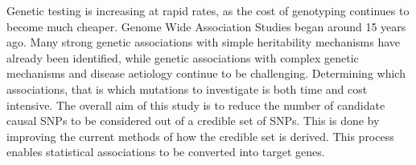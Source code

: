 Genetic testing is increasing at rapid rates, as the cost of genotyping continues to become much cheaper. Genome Wide Association Studies began around 15 years ago. Many strong genetic associations with simple heritability mechanisms have already been identified, while genetic associations with complex genetic mechanisms and disease aetiology continue to be challenging. Determining which associations, that is which mutations to investigate is both time and cost intensive. The overall aim of this study is to reduce the number of candidate causal SNPs to be considered out of a credible set of SNPs. This is done by improving the current methods of how the credible set is derived. This process enables statistical associations to be converted into target genes. 